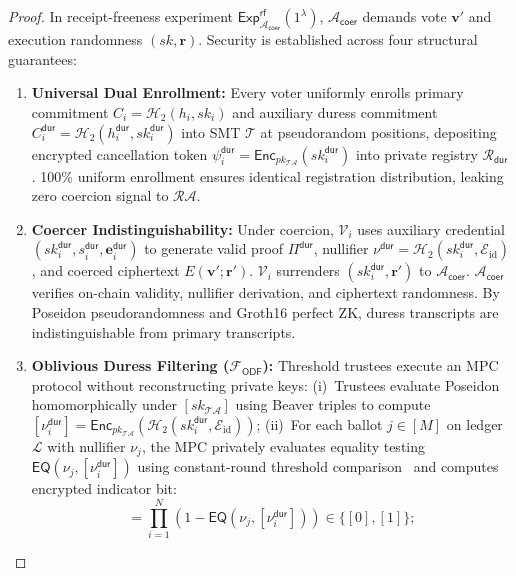 \documentclass[10pt,letterpaper,journal]{IEEEtran}
\begin{document}
\begin{proof}
In receipt-freeness experiment $\mathsf{Exp}_{\mathcal{A}_{\mathsf{coer}}}^{\mathsf{rf}}(1^\lambda)$, $\mathcal{A}_{\mathsf{coer}}$ demands vote $\mathbf{v}'$ and execution randomness $(sk, \mathbf{r})$. Security is established across four structural guarantees:
\begin{enumerate}[leftmargin=*,noitemsep]
  \item \textbf{Universal Dual Enrollment:} Every voter uniformly enrolls primary commitment $C_i = \mathcal{H}_2(h_i, sk_i)$ and auxiliary duress commitment $C_i^{\mathsf{dur}} = \mathcal{H}_2(h_i^{\mathsf{dur}}, sk_i^{\mathsf{dur}})$ into SMT $\mathcal{T}$ at pseudorandom positions, depositing encrypted cancellation token $\psi_i^{\mathsf{dur}} = \mathsf{Enc}_{pk_{\mathcal{TA}}}(sk_i^{\mathsf{dur}})$ into private registry $\mathcal{R}_{\mathsf{dur}}$. 100\% uniform enrollment ensures identical registration distribution, leaking zero coercion signal to $\mathcal{RA}$.
  \item \textbf{Coercer Indistinguishability:} Under coercion, $\mathcal{V}_i$ uses auxiliary credential $(sk_i^{\mathsf{dur}}, s_i^{\mathsf{dur}}, \mathbf{e}_i^{\mathsf{dur}})$ to generate valid proof $\Pi^{\mathsf{dur}}$, nullifier $\nu^{\mathsf{dur}} = \mathcal{H}_2(sk_i^{\mathsf{dur}}, \mathcal{E}_{\mathrm{id}})$, and coerced ciphertext $E(\mathbf{v}'; \mathbf{r}')$. $\mathcal{V}_i$ surrenders $(sk_i^{\mathsf{dur}}, \mathbf{r}')$ to $\mathcal{A}_{\mathsf{coer}}$. $\mathcal{A}_{\mathsf{coer}}$ verifies on-chain validity, nullifier derivation, and ciphertext randomness. By Poseidon pseudorandomness and Groth16 perfect ZK, duress transcripts are indistinguishable from primary transcripts.
  \item \textbf{Oblivious Duress Filtering ($\mathcal{F}_{\mathsf{ODF}}$):} Threshold trustees execute an MPC protocol without reconstructing private keys:
  (i)~Trustees evaluate Poseidon homomorphically under $[sk_{\mathcal{TA}}]$ using Beaver triples to compute $[\nu_i^{\mathsf{dur}}] = \mathsf{Enc}_{pk_{\mathcal{TA}}}(\mathcal{H}_2(sk_i^{\mathsf{dur}}, \mathcal{E}_{\mathrm{id}}))$;
  (ii)~For each ballot $j \in [M]$ on ledger $\mathcal{L}$ with nullifier $\nu_j$, the MPC privately evaluates equality testing $\mathsf{EQ}(\nu_j, [\nu_i^{\mathsf{dur}}])$ using constant-round threshold comparison~\cite{Damgard2006,Lipmaa2013} and computes encrypted indicator bit:
  \begin{equation}
    [b_j] = \prod_{i=1}^N \left(1 - \mathsf{EQ}(\nu_j, [\nu_i^{\mathsf{dur}}])\right) \in \{[0], [1]\};

\end{equation}
\end{enumerate}
\end{proof}
\end{document}
